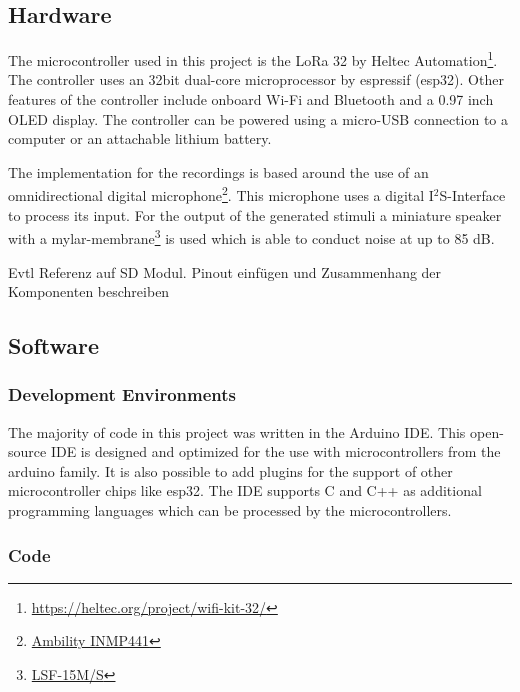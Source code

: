 \subsection{Hardware}
The microcontroller used in this project is the LoRa 32 by Heltec Automation\footnote{\url{https://heltec.org/project/wifi-kit-32/}}.
The controller uses an 32bit dual-core microprocessor by espressif (esp32).
Other features of the controller include onboard Wi-Fi and Bluetooth and a 0.97 inch OLED display.
The controller can be powered using a micro-USB connection to a computer or an attachable lithium battery.

The implementation for the recordings is based around the use of an omnidirectional digital microphone\footnote{\href{https://www.amazon.de/Ambility-Omnidirektionales-Mikrofonmodul-I2S-Schnittstelle-Precision/dp/B07MW95PSS}{Ambility INMP441}}.
This microphone uses a digital I$^{2}$S-Interface to process its input. 
For the output of the generated stimuli a miniature speaker with a mylar-membrane\footnote{\href{https://www.conrad.de/de/p/lsf-15m-s-8-ohm-0-8w-miniatur-lautsprecher-geraeusch-entwicklung-85-db-0-500-w-1-st-710277.html}{LSF-15M/S}} is used which is able to conduct noise at up to 85 dB.


Evtl Referenz auf SD Modul.
Pinout einfügen und Zusammenhang der Komponenten beschreiben
\subsection{Software}
\subsubsection{Development Environments}
The majority of code in this project was written in the Arduino IDE. 
This open-source IDE is designed and optimized for the use with microcontrollers from the arduino family.
It is also possible to add plugins for the support of other microcontroller chips like esp32.
The IDE supports C and C++ as additional programming languages which can be processed by the microcontrollers.

\subsubsection{Code}


